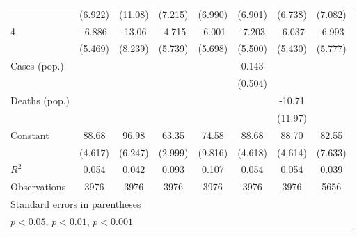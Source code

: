 \documentclass{article}
\begin{document}
{\begin{longtable}{l*{7}{c}}
                &  (6.922)         &  (11.08)         &  (7.215)         &  (6.990)         &  (6.901)         &  (6.738)         &  (7.082)         \\
4               &   -6.886         &   -13.06         &   -4.715         &   -6.001         &   -7.203         &   -6.037         &   -6.993         \\
                &  (5.469)         &  (8.239)         &  (5.739)         &  (5.698)         &  (5.500)         &  (5.430)         &  (5.777)         \\
Cases (pop.)    &                  &                  &                  &                  &    0.143         &                  &                  \\
                &                  &                  &                  &                  &  (0.504)         &                  &                  \\
Deaths (pop.)   &                  &                  &                  &                  &                  &   -10.71         &                  \\
                &                  &                  &                  &                  &                  &  (11.97)         &                  \\
Constant        &    88.68\sym{***}&    96.98\sym{***}&    63.35\sym{***}&    74.58\sym{***}&    88.68\sym{***}&    88.70\sym{***}&    82.55\sym{***}\\
                &  (4.617)         &  (6.247)         &  (2.999)         &  (9.816)         &  (4.618)         &  (4.614)         &  (7.633)         \\
\hline
\(R^{2}\)       &    0.054         &    0.042         &    0.093         &    0.107         &    0.054         &    0.054         &    0.039         \\
Observations    &     3976         &     3976         &     3976         &     3976         &     3976         &     3976         &     5656         \\
\hline\hline
\multicolumn{8}{l}{\footnotesize Standard errors in parentheses}\\
\multicolumn{8}{l}{\footnotesize \sym{*} \(p<0.05\), \sym{**} \(p<0.01\), \sym{***} \(p<0.001\)}\\
\end{longtable}
}
\end{document}
